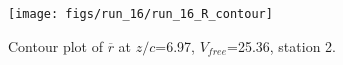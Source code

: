 \begin{figure}[H]
\centering
\texttt{[image: figs/run\_16/run\_16\_R\_contour]}
\caption{Contour plot of $\overline{r}$ at $z/c$=6.97, $V_{free}$=25.36, station 2.}
\label{fig:run_16_R_contour}
\end{figure}


